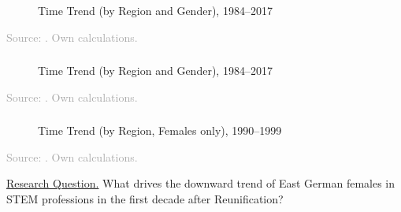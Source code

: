 \documentclass[11pt, aspectratio=1610, xcolor={dvipsnames}]{beamer}
\begin{document}
	\begin{frame}
		\frametitle{}
		
		\begin{figure}[h]
			\centering
			\caption{Time Trend (by Region and Gender), 1984--2017}
			\label{fig:trend}
			\resizebox{75mm}{!}{}
		\end{figure}
		
		{\scriptsize
			\textcolor{darkgray}{Source: \cite{SOEP2023}. Own calculations.}
		}
		
		\hyperlink{baseline}{}
	
	\end{frame}
	
	\begin{frame}
		\frametitle{}
		
		\hypertarget{graph}{}
		
		\begin{figure}[h]
			\centering
			\caption{Time Trend (by Region and Gender), 1984--2017}
			\label{fig:trend_highlight}
			\resizebox{75mm}{!}{}
		\end{figure}
		
		{\scriptsize
			\textcolor{darkgray}{Source: \cite{SOEP2023}. Own calculations.}
		}
		
		\hyperlink{baseline}{\beamerbutton{Regressions}}
		
	\end{frame}
	
	\begin{frame}
		\frametitle{}
		
		\begin{figure}[h]
			\centering
			\caption{Time Trend (by Region, Females only), 1990--1999}
			\label{fig:trend_zoomed}
			\resizebox{75mm}{!}{}
		\end{figure}
		
		{\scriptsize
			\textcolor{darkgray}{Source: \cite{SOEP2023}. Own calculations.}
		}
		
	\end{frame}
	
	\begin{frame}
		
		\textcolor{PineGreen}{\underline{Research Question.}} What drives the downward trend of East German females in STEM professions in the first decade after Reunification?
		
	\end{frame}
	
\end{document}
